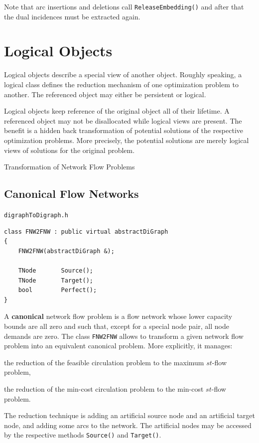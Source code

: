 \documentclass[a4paper,11pt,twoside]{book}
\begin{document}
\begin{multicols}{2}
Note that arc insertions and deletions call \verb/ReleaseEmbedding()/ and after
that the dual incidences must be extracted again.


\section{Logical Objects}
Logical objects describe a special view of another object. Roughly speaking,
a logical class defines the reduction mechanism of one optimization problem
to another. The referenced object may either be persistent or logical.

Logical objects keep reference of the original object all of their lifetime.
A referenced object may not be disallocated while logical views are present.
The benefit is a hidden back transformation of potential solutions of
the respective optimization problems. More precisely, the potential solutions
are merely logical views of solutions for the original problem.

\bigskip
\begin{figurehere}
\begin{center}
\epsfxsize=4cm
\epsfxsize=7cm
\hspace*{1cm}
\vspace{0.5cm}
\caption{\label{flb_canonical}Transformation of Network Flow Problems}
\end{center}
\end{figurehere}


\subsection{Canonical Flow Networks}
\label{slb231}
\myinclude\verb/digraphToDigraph.h/
\begin{mymethods}
\begin{verbatim}
class FNW2FNW : public virtual abstractDiGraph
{
    FNW2FNW(abstractDiGraph &);

    TNode       Source();
    TNode       Target();
    bool        Perfect();
}
\end{verbatim}
\end{mymethods}
A {\bf canonical} network flow problem is a flow network whose lower capacity
bounds are all zero and such that, except for a special node pair, all node
demands are zero. The class \verb/FNW2FNW/ allows to transform a given network
flow problem into an equivalent canonical problem. More explicitly, it manages:
\begin{myitemize}
\item[(1)] the reduction of the feasible circulation problem to the maximum
    $st$-flow problem,
\item[(2)] the reduction of the min-cost circulation problem to the min-cost
    $st$-flow problem.
\end{myitemize}
The reduction technique is adding an artificial source node and an artificial
target node, and adding some arcs to the network. The artificial nodes may be
accessed by the respective methods \verb/Source()/ and \verb/Target()/.


\end{multicols}
\end{document}
